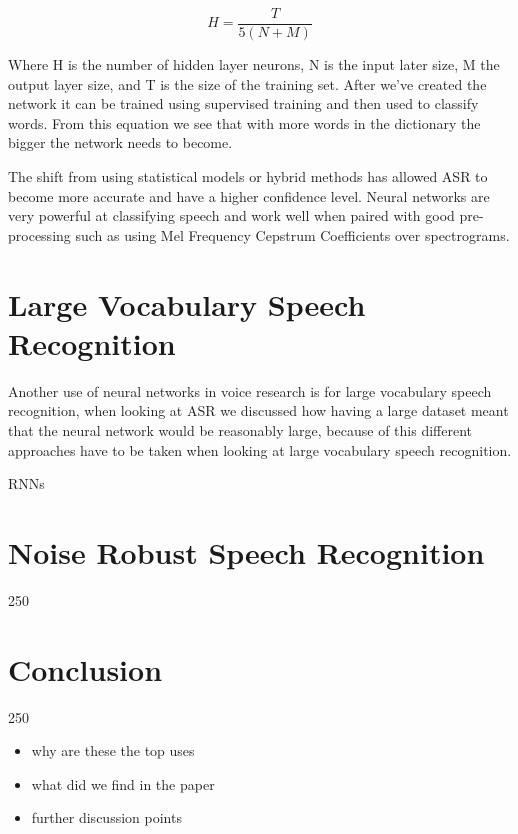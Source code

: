 \documentclass[11pt]{article}
\begin{document}
    \begin{equation}
    H = \frac{T}{5(N+M)}
    \end{equation}
    
    Where H is the number of hidden layer neurons, N is the input later size, M the output layer size, and T is the size of the training set. After we've created the network it can be trained using supervised training and then used to classify words. From this equation we see that with more words in the dictionary the bigger the network needs to become.
    
    The shift from using statistical models or hybrid methods has allowed ASR to become more accurate and have a higher confidence level. Neural networks are very powerful at classifying speech and work well when paired with good pre-processing such as using Mel Frequency Cepstrum Coefficients over spectrograms.
    

    \section{Large Vocabulary Speech Recognition}
    Another use of neural networks in voice research is for large vocabulary speech recognition, when looking at ASR we discussed how having a large dataset meant that the neural network would be reasonably large, because of this different approaches have to be taken when looking at large vocabulary speech recognition.
    
    RNNs
    
    
    \section{Noise Robust Speech Recognition}
    
    250
    
    \section{Conclusion}
    250
    \begin{itemize}
        \item why are these the top uses
        \item what did we find in the paper
        \item further discussion points
    \end{itemize}
    
        


\pagebreak

\printbibliography
\end{document}
